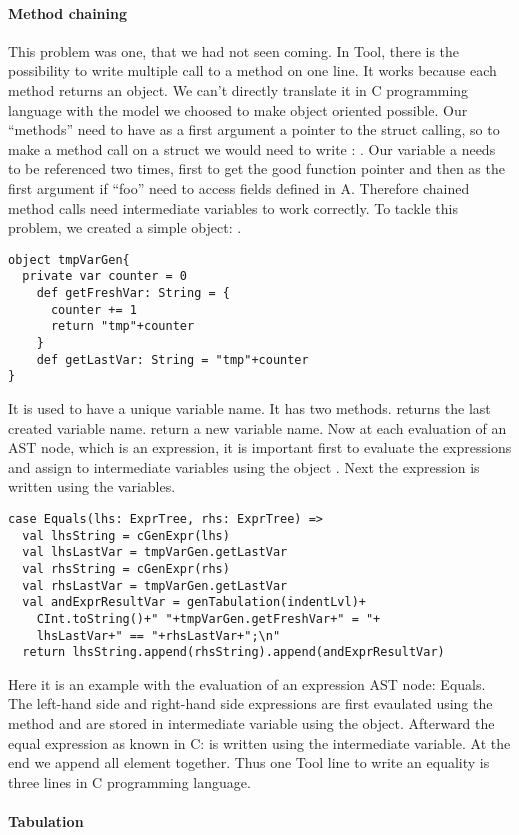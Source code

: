 \paragraph{Method chaining}
\break
This problem was one, that we had not seen coming.
\newline
In Tool, there is the possibility to write multiple call to a method on one line.
It works because each method returns an object.
We can't directly translate it in C programming language with the model we choosed to make object oriented possible.
Our ``methods'' need to have as a first argument a pointer to the struct calling,
so to make a method call on a struct we would need to write : \lstset{style=customc}{\lstinline[basicstyle=\small\ttfamily]|void * a = new(nA); ((struct A *) a)->foo(a)|}.
Our variable a needs to be referenced two times, first to get the good function pointer and then as the first argument if ``foo'' need to access fields defined in A.
Therefore chained method calls need intermediate variables to work correctly.
To tackle this problem, we created a simple object: .
\lstset{style=customscala}
\begin{lstlisting}
object tmpVarGen{
  private var counter = 0
    def getFreshVar: String = {
      counter += 1
      return "tmp"+counter
    }
    def getLastVar: String = "tmp"+counter
}
\end{lstlisting}
It is used to have a unique variable name. It has two methods.
 returns the last created variable name.
 return a new variable name.
\newline
Now at each evaluation of an AST node, which is an expression, it is important first to evaluate the expressions
and assign to intermediate variables using the object . Next the expression is written using
the variables.
\begin{lstlisting}
case Equals(lhs: ExprTree, rhs: ExprTree) =>
  val lhsString = cGenExpr(lhs)
  val lhsLastVar = tmpVarGen.getLastVar
  val rhsString = cGenExpr(rhs)
  val rhsLastVar = tmpVarGen.getLastVar
  val andExprResultVar = genTabulation(indentLvl)+
    CInt.toString()+" "+tmpVarGen.getFreshVar+" = "+
    lhsLastVar+" == "+rhsLastVar+";\n"
  return lhsString.append(rhsString).append(andExprResultVar)
\end{lstlisting}
Here it is an example with the evaluation of an expression AST node: Equals.
The left-hand side and right-hand side expressions are first evaulated using the  method and
are stored in intermediate variable using the  object.
Afterward the equal expression as known in C:  is written using the intermediate variable.
At the end we append all element together. Thus one Tool line to write an equality is
three lines in C programming language.
\newline
\paragraph{Tabulation}
